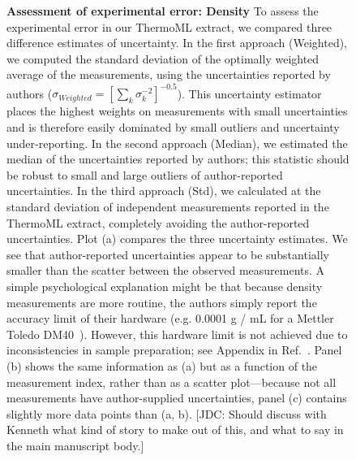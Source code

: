 \documentclass[aps,pre,twocolumn,nofootinbib,superscriptaddress,linenumbers]{revtex4-1}
\begin{document}
\begin{figure}
\caption{{\bf Assessment of experimental error: Density}
To assess the experimental error in our ThermoML extract, we compared three difference estimates of uncertainty.  
In the first approach (Weighted), we computed the standard deviation of the optimally weighted average of the measurements, using the uncertainties reported by authors ($\sigma_{Weighted} = [\sum_k \sigma_k^{-2}]^{-0.5}$).
This uncertainty estimator places the highest weights on measurements with small uncertainties and is therefore easily dominated by small outliers and uncertainty under-reporting.
In the second approach (Median), we estimated the median of the uncertainties reported by authors; this statistic should be robust to small and large outliers of author-reported uncertainties.
In the third approach (Std), we calculated at the standard deviation of independent measurements reported in the ThermoML extract, completely avoiding the author-reported uncertainties.
Plot (a) compares the three uncertainty estimates.
We see that author-reported uncertainties appear to be substantially smaller than the scatter between the observed measurements.
A simple psychological explanation might be that because density measurements are more routine, the authors simply report the accuracy limit of their hardware (e.g. 0.0001 g / mL for a Mettler Toledo DM40~\cite{mettlertoledo}).  
However, this hardware limit is not achieved due to inconsistencies in sample preparation; see Appendix in Ref.~\cite{chirico2013improvement}.  
Panel (b) shows the same information as (a) but as a function of the measurement index, rather than as a scatter plot---because not all measurements have author-supplied uncertainties, panel (c) contains slightly more data points than (a, b).  
{\color{red}[JDC: Should discuss with Kenneth what kind of story to make out of this, and what to say in the main manuscript body.]}
}
\label{figure:ErrorAnalysisDensity}

\end{figure}



\clearpage
\end{document}
